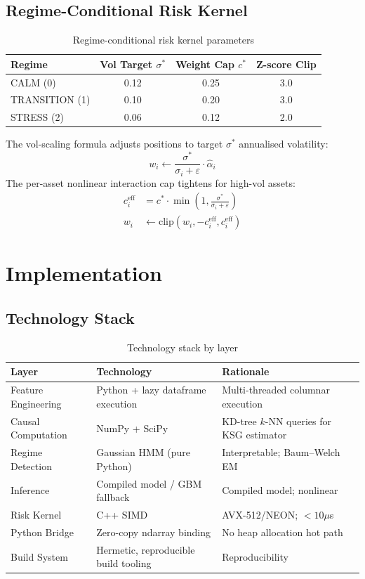 \documentclass[11pt]{article}
\begin{document}
\subsection{Regime-Conditional Risk Kernel}

\begin{table}[h]
\centering
\caption{Regime-conditional risk kernel parameters}
\begin{tabular}{lccc}
\toprule
Regime & Vol Target $\sigma^*$ & Weight Cap $c^*$ & Z-score Clip \\
\midrule
CALM (0)       & 0.12 & 0.25 & 3.0 \\
TRANSITION (1) & 0.10 & 0.20 & 3.0 \\
STRESS (2)     & 0.06 & 0.12 & 2.0 \\
\bottomrule
\end{tabular}
\end{table}

The vol-scaling formula adjusts positions to target $\sigma^*$ annualised volatility:
\begin{equation}
w_i \leftarrow \frac{\sigma^*}{\sigma_i + \varepsilon} \cdot \hat{\alpha}_i
\label{eq:vol-scaling}
\end{equation}
The per-asset nonlinear interaction cap tightens for high-vol assets:
\begin{align}
c_i^{\text{eff}} &= c^* \cdot \min\left(1, \frac{\sigma^*}{\sigma_i + \varepsilon}\right) \label{eq:c-eff} \\
w_i &\leftarrow \text{clip}(w_i, -c_i^{\text{eff}}, c_i^{\text{eff}}) \label{eq:w-clip}
\end{align}

\section{Implementation}

\subsection{Technology Stack}

\begin{table}[h]
\centering
\caption{Technology stack by layer}
\begin{tabular}{lll}
\toprule
Layer & Technology & Rationale \\
\midrule
Feature Engineering & Python + lazy dataframe execution & Multi-threaded columnar execution \\
Causal Computation & NumPy + SciPy & KD-tree $k$-NN queries for KSG estimator \\
Regime Detection & Gaussian HMM (pure Python) & Interpretable; Baum--Welch EM \\
Inference & Compiled model / GBM fallback & Compiled model; nonlinear \\
Risk Kernel & C++ SIMD & AVX-512/NEON; $< 10\mu$s \\
Python Bridge & Zero-copy ndarray binding & No heap allocation hot path \\
Build System & Hermetic, reproducible build tooling & Reproducibility \\
\bottomrule
\end{tabular}
\end{table}
\end{document}
